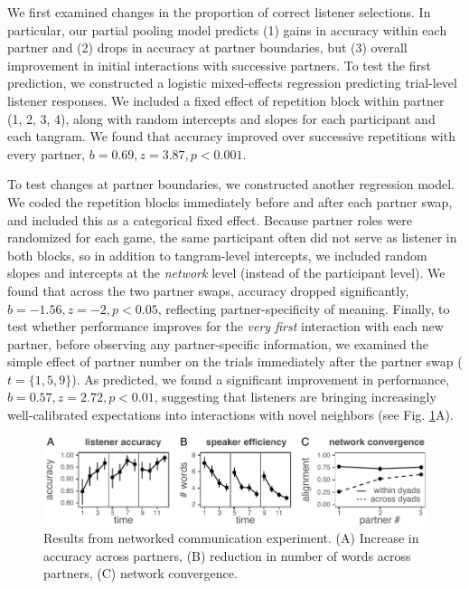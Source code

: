 We first examined changes in the proportion of correct listener selections.
In particular, our partial pooling model predicts (1) gains in accuracy within each partner and (2) drops in accuracy at partner boundaries, but (3) overall improvement in initial interactions with successive partners.
To test the first prediction, we constructed a logistic mixed-effects regression predicting trial-level listener responses. 
We included a fixed effect of repetition block within partner (1, 2, 3, 4), along with random intercepts and slopes for each participant and each tangram. 
We found that accuracy improved over successive repetitions with every partner, $b=0.69,z=3.87, p<0.001$.

To test changes at partner boundaries, we constructed another regression model.
We coded the repetition blocks immediately before and after each partner swap, and included this as a categorical fixed effect.
Because partner roles were randomized for each game, the same participant often did not serve as listener in both blocks, so in addition to tangram-level intercepts, we included random slopes and intercepts at the \emph{network} level (instead of the participant level).
We found that across the two partner swaps, accuracy dropped significantly, $b = -1.56, z = -2, p < 0.05$, reflecting partner-specificity of meaning.
Finally, to test whether performance improves for the \emph{very first} interaction with each new partner, before observing any partner-specific information, we examined the simple effect of partner number on the trials immediately after the partner swap ($t=\{1,5,9\}$).
As predicted, we found a significant improvement in performance, $b = 0.57, z = 2.72, p < 0.01$, suggesting that listeners are bringing increasingly well-calibrated expectations into interactions with novel neighbors (see Fig. \ref{fig:results}A).

\begin{figure}
\includegraphics[scale=1.1]{./figures/sec3-empirical-results.pdf}
\caption{Results from networked communication experiment. (A) Increase in accuracy across partners, (B) reduction in number of words across partners, (C) network convergence.}
\label{fig:results}
\end{figure}


